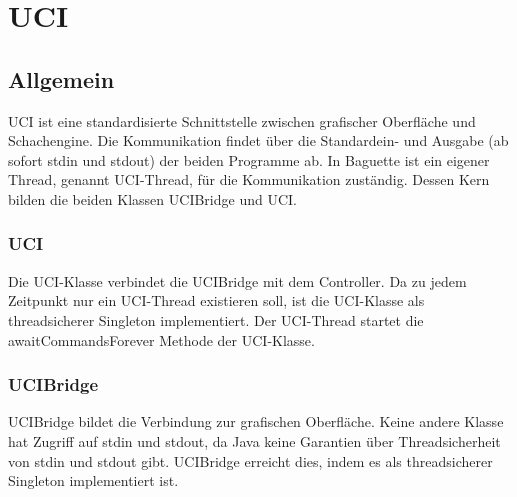 
\section{UCI}\label{sec:uci}
\subsection{Allgemein}\label{subsec:allgemein}
UCI ist eine standardisierte Schnittstelle zwischen grafischer Oberfl\"ache und Schachengine.
Die Kommunikation findet \"uber die Standardein- und Ausgabe (ab sofort stdin und stdout) der beiden Programme ab.
\newline
In Baguette ist ein eigener Thread, genannt UCI-Thread, f\"ur die Kommunikation zust\"andig.
Dessen Kern bilden die beiden Klassen UCIBridge und UCI\@.

\subsubsection{UCI}
Die UCI-Klasse verbindet die UCIBridge mit dem Controller.
Da zu jedem Zeitpunkt nur ein UCI-Thread existieren soll, ist die UCI-Klasse als threadsicherer Singleton implementiert.
Der UCI-Thread startet die awaitCommandsForever Methode der UCI-Klasse.

\subsubsection{UCIBridge}
UCIBridge bildet die Verbindung zur grafischen Oberfl\"ache.
Keine andere Klasse hat Zugriff auf stdin und stdout, da Java keine Garantien \"uber Threadsicherheit von stdin und stdout gibt.
UCIBridge erreicht dies, indem es als threadsicherer Singleton implementiert ist.
\pagebreak